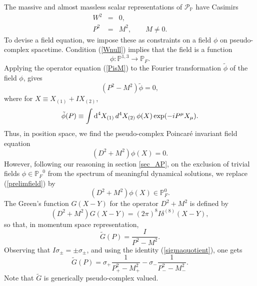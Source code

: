 \documentclass[a4paper,aps,prd,showkeys,showpacs,superscriptaddress,preprint]{revtex4}
\newcommand{\pc}{\mathbb{P}}
\begin{document}
The massive and almost massless scalar representations of
$\mathcal{P}_\pc$ have Casimirs
\begin{subequations}
\begin{eqnarray}
  W^2 &=& 0,\label{Wnull}\\
  P^2 &=& M^2,\qquad M\neq 0\label{PisM}.
\end{eqnarray}
\end{subequations}
To devise a field equation, 
we impose these as constraints on a field $\phi$ on pseudo-complex
spacetime. Condition (\ref{Wnull}) implies that the field is a
function
\begin{equation}
  \phi: \pc^{1,3} \longrightarrow \pc_F.
\end{equation}  
Applying the operator equation (\ref{PisM}) to the Fourier transformation $\tilde
\phi$ of the field $\phi$, gives
\begin{equation}\label{praeeom}
  (P^2 - M^2) \tilde\phi = 0,
\end{equation}
where for $X \equiv X_{(1)} + I X_{(2)}$,
\begin{equation}\label{pcFourierformula}
  \tilde\phi(P) \equiv \int \textrm{d}^4 X_{(1)}\textrm\,{d}^4
  X_{(2)}\, \phi(X) \exp(-iP^\mu X_\mu). 
\end{equation}
Thus, in position space, we find the pseudo-complex Poincar\'e
invariant field equation
\begin{equation}\label{prelimfield}
  (D^2 + M^2) \phi(X) = 0.
\end{equation}
However, following our reasoning in section \ref{sec_AP}, on the exclusion of trivial fields
$\phi \in {\pc_F}^0$ from the spectrum of meaningful dynamical
solutions, we replace (\ref{prelimfield}) by 
\begin{equation}\label{KGmomspace}
  (D^2 + M^2) \phi(X) \in \pc_F^0.
\end{equation}
The Green's function $G(X-Y)$ for the operator $D^2 + M^2$ is defined
by
\begin{equation}
  (D^2 + M^2) G(X-Y) = (2 \pi)^8 I \delta^{(8)}(X-Y),
\end{equation}
so that, in momentum space representation, 
\begin{equation}\label{PKGprop}
  \tilde G(P) = \frac{I}{P^2 - M^2}.
\end{equation}
Observing that $I \sigma_\pm = \pm \sigma_\pm$, and using the identity
(\ref{sigmaquotient}), one gets
\begin{equation}
  \tilde G(P) = \sigma_+ \frac{1}{P_+^2 - M_+^2} - \sigma_- \frac{1}{P_-^2 - M_-^2}.
\end{equation}
Note that $\tilde G$ is generically pseudo-complex valued. 
\end{document}
